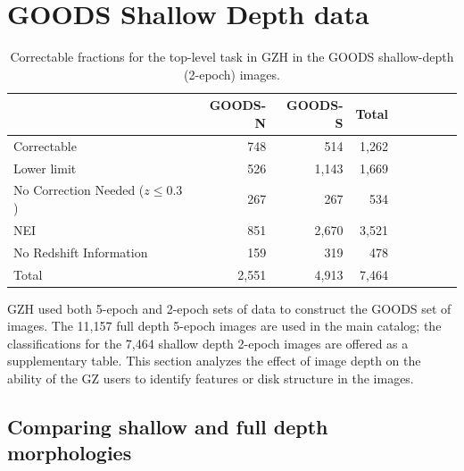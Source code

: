 \documentclass[twocolumn]{aastex6}
\begin{document}
\newpage
\clearpage

\appendix

\section{GOODS Shallow Depth data}


\begin{table}
\caption{Correctable fractions for the top-level task in GZH in the GOODS shallow-depth (2-epoch) images. \label{tbl:goods_shallow_categories}}
\begin{tabular}{lrrrrrrrr}
\hline\hline
                                   & GOODS-N & GOODS-S & Total \\
\hline
Correctable                        & 748     & 514     & 1,262 \\
Lower limit                        & 526     & 1,143   & 1,669 \\
No Correction Needed ($z \le 0.3$) & 267     & 267     & 534   \\ 
NEI                                & 851     & 2,670   & 3,521 \\
No Redshift Information            & 159     & 319     & 478   \\
Total                              & 2,551   & 4,913   & 7,464 \\
\hline\hline
\end{tabular}
\end{table}

GZH used both 5-epoch and 2-epoch sets of data to construct the GOODS set of images. The 11,157 full depth 5-epoch images are used in the main catalog; the classifications for the 7,464 shallow depth 2-epoch images are offered as a supplementary table. This section analyzes the effect of image depth on the ability of the GZ users to identify features or disk structure in the images. 

\subsection{Comparing shallow and full depth morphologies}
\end{document}
